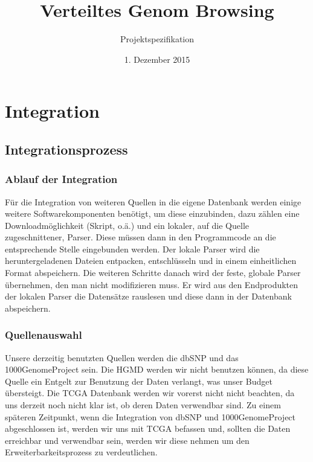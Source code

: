 \documentclass{scrartcl}
\title{Verteiltes Genom Browsing}
\subtitle{Projektspezifikation}
\date{1. Dezember 2015}
\begin{document}
\pagestyle{fancy}
\cfoot{}
\rfoot{\pagemark}
\lhead{}
\rhead{}


\setcounter{page}{-1}
\maketitle
\thispagestyle{empty}
\newpage

\tableofcontents
\thispagestyle{empty}
\newpage


\section{Integration}
\subsection{Integrationsprozess}
\subsubsection{Ablauf der Integration}
Für die Integration von weiteren Quellen in die eigene Datenbank werden einige weitere Softwarekomponenten benötigt, um diese einzubinden, dazu zählen eine Downloadmöglichkeit (Skript, o.ä.) und ein lokaler, auf die Quelle zugeschnittener, Parser. Diese müssen dann in den Programmcode an die entsprechende Stelle eingebunden werden. Der lokale Parser wird die heruntergeladenen Dateien entpacken, entschlüsseln und in einem einheitlichen Format abspeichern. Die weiteren Schritte danach wird der feste, globale Parser übernehmen, den man nicht modifizieren muss. Er wird aus den Endprodukten der lokalen Parser die Datensätze rauslesen und diese dann in der Datenbank abspeichern.
\subsubsection{Quellenauswahl}
Unsere derzeitig benutzten Quellen werden die dbSNP und das 1000GenomeProject sein. Die HGMD werden wir nicht benutzen können, da diese Quelle ein Entgelt zur Benutzung der Daten verlangt, was unser Budget übersteigt. Die TCGA Datenbank werden wir vorerst nicht nicht beachten, da uns derzeit noch nicht klar ist, ob deren Daten verwendbar sind. Zu einem späteren Zeitpunkt, wenn die Integration von dbSNP und 1000GenomeProject abgeschlossen ist, werden wir uns mit TCGA befassen und, sollten die Daten erreichbar und verwendbar sein, werden wir diese nehmen um den Erweiterbarkeitsprozess zu verdeutlichen.
\end{document}
